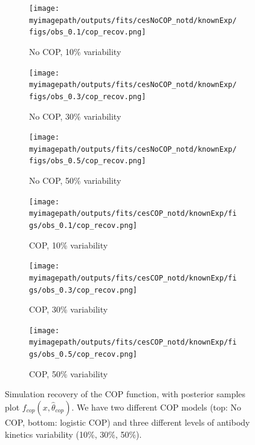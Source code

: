 \begin{figure}[H]

    \centering
    \begin{subfigure}{0.31\textwidth}
        \centering
        \texttt{[image: \\myimagepath/outputs/fits/cesNoCOP\_notd/knownExp/figs/obs\_0.1/cop\_recov.png]}
        \caption{No COP, 10\% variability\label{fit1:copA}}
    \end{subfigure}
    \begin{subfigure}{0.31\textwidth}
        \centering
        \texttt{[image: \\myimagepath/outputs/fits/cesNoCOP\_notd/knownExp/figs/obs\_0.3/cop\_recov.png]}
        \caption{No COP, 30\% variability \label{fit1:copB}}
    \end{subfigure}
    \begin{subfigure}{0.31\textwidth}
        \centering
        \texttt{[image: \\myimagepath/outputs/fits/cesNoCOP\_notd/knownExp/figs/obs\_0.5/cop\_recov.png]}
        \caption{No COP, 50\% variability \label{fit1:copC}}
    \end{subfigure}
    
  \begin{subfigure}{0.31\textwidth}
        \centering
        \texttt{[image: \\myimagepath/outputs/fits/cesCOP\_notd/knownExp/figs/obs\_0.1/cop\_recov.png]}
        \caption{ COP, 10\% variability\label{fit1:copD}}
    \end{subfigure}
    \begin{subfigure}{0.31\textwidth}
        \centering
        \texttt{[image: \\myimagepath/outputs/fits/cesCOP\_notd/knownExp/figs/obs\_0.3/cop\_recov.png]}
        \caption{ COP, 30\% variability \label{fit1:copE}}
    \end{subfigure}
    \begin{subfigure}{0.31\textwidth}
        \centering
        \texttt{[image: \\myimagepath/outputs/fits/cesCOP\_notd/knownExp/figs/obs\_0.5/cop\_recov.png]}
        \caption{ COP, 50\% variability \label{fit1:copF}}
    \end{subfigure}
    
    \caption{Simulation recovery of the COP function, with posterior samples plot  $f_{cop}(x, \hat{\theta}_{cop})$. We have two different COP models (top: No COP, bottom: logistic COP) and three different levels of antibody kinetics variability (10\%, 30\%, 50\%). \label{fit1:cop}}
    \end{figure}


